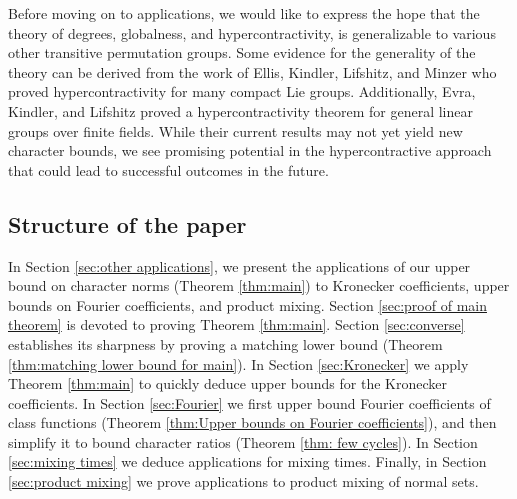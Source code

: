 \documentclass[11pt, letterpaper]{amsart}
\begin{document}
Before moving on to applications, we would like to express the hope that the theory of degrees, globalness, and hypercontractivity, is generalizable to various other transitive permutation groups. Some evidence for the generality of the theory can be derived from the work of Ellis, Kindler, Lifshitz, and Minzer \cite{Ellis2023product} who proved hypercontractivity for many compact Lie groups. 
Additionally, Evra, Kindler, and Lifshitz \cite{Evra2023Hypercontractivity} proved a hypercontractivity theorem for general linear groups over finite fields. 
While their current results may not yet yield new character bounds, we see promising potential in the hypercontractive approach that could lead to successful outcomes in the future.
\subsection*{Structure of the paper}
In Section \ref{sec:other applications}, we present the applications of our upper bound on character norms (Theorem \ref{thm:main}) to Kronecker coefficients, upper bounds on Fourier coefficients, and product mixing. Section \ref{sec:proof of main theorem} is devoted to proving Theorem \ref{thm:main}. Section \ref{sec:converse} establishes its sharpness by proving a matching lower bound (Theorem \ref{thm:matching lower bound for main}). In Section \ref{sec:Kronecker} we apply Theorem \ref{thm:main} to quickly deduce upper bounds for the Kronecker coefficients. In Section \ref{sec:Fourier} we first upper bound Fourier coefficients of class functions (Theorem \ref{thm:Upper bounds on Fourier coefficients}), and then simplify it to bound character ratios (Theorem \ref{thm: few cycles}). In Section \ref{sec:mixing times} we deduce applications for mixing times. Finally, in Section \ref{sec:product mixing} we prove applications to product mixing of normal sets.
\end{document}
